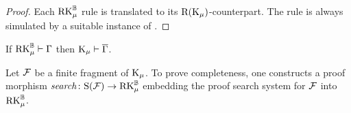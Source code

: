 \begin{proof}

  Each $\mathrm{RK}_\mu^{\mathbb{B}}$ rule is translated to its $\mathrm{R}(\mathrm{K}_\mu)$-counterpart. The rule
  \RMerge{} is always simulated by a suitable instance of \RWeak{}.
\end{proof}

\begin{corollary}[Soundness]
  If $\mathrm{RK}_\mu^{\mathbb{B}} \vdash \Gamma$ then $\mathrm{K}_\mu \vdash \overline{\Gamma}$.
\end{corollary}

Let $\mathcal{F}$ be a finite fragment of $\mathrm{K}_\mu$. To prove completeness, one constructs
a proof morphism $\mathit{search} \colon \mathrm{S}(\mathcal{F}) \to \mathrm{RK}_\mu^{\mathbb{B}}$ embedding the proof search system
for $\mathcal{F}$ into $\mathrm{RK}_\mu^{\mathbb{B}}$.

